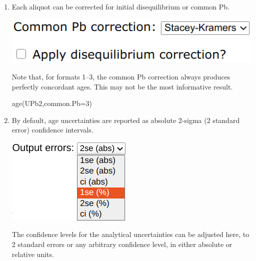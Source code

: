\begin{refsection}
\begin{enumerate}

\item Each aliquot can be corrected for initial disequilibrium or
  common Pb.

\noindent\begin{minipage}[t]{.4\linewidth}
\strut\vspace*{-\baselineskip}\newline
\includegraphics[width=\linewidth]{../figures/UPbAgesPb0diseq.png}
\end{minipage}
\begin{minipage}[t]{.6\linewidth}
  Note that, for formats 1--3, the common Pb correction always
  produces perfectly concordant ages. This may not be the most
  informative result.
\end{minipage}

\begin{console}
age(UPb2,common.Pb=3)
\end{console}

\item By default, age uncertainties are reported as absolute 2-sigma
  (2 standard error) confidence intervals.

\noindent\begin{minipage}[t]{.25\linewidth}
\strut\vspace*{-\baselineskip}\newline
\includegraphics[width=\linewidth]{../figures/oerr.png}
\end{minipage}
\begin{minipage}[t]{.75\linewidth}
  The confidence levels for the analytical uncertainties can be
  adjusted here, to 2 standard errors or any arbitrary confidence
  level, in either absolute or relative units.
\end{minipage}


\end{enumerate}
\end{refsection}
